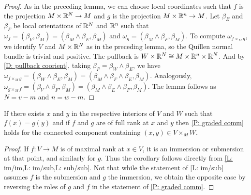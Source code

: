 \begin{proof}
	As in the preceding lemma, we can choose local coordinates such that $f$ is the projection $M\times \mathbb{R}^N\to M$ and $g$ is the projection $M\times \mathbb{R}^n\to M$.
	Let $\beta_E$ and $\beta_F$ be local orientations of $\mathbb{R}^N$ and $\mathbb{R}^n$ such that $\omega_f=(\beta_V,\beta_M)=(\beta_M\wedge \beta_E,\beta_M)$ and $\omega_g=(\beta_M\wedge \beta_F,\beta_M)$.
	To compute $\omega_{f\times_Mg}$, we identify $V$ and $M\times \mathbb{R}^N$ as in the preceding lemma, so the Quillen normal bundle is trivial and positive.
	The pullback is $W\times \mathbb{R}^N\cong M\times \mathbb{R}^n\times \mathbb{R}^N$.
	And by \cref{D: pullback coorient}, taking $\beta_P=\beta_W\wedge \beta_E$, we have $\omega_{f\times_Mg}=(\beta_W\wedge \beta_E,\beta_M)=(\beta_M\wedge \beta_F\wedge \beta_E,\beta_M)$.
	Analogously, $\omega_{g\times_Mf}=(\beta_V\wedge \beta_F,\beta_M)=(\beta_M\wedge \beta_E\wedge \beta_F,\beta_M)$.
	The lemma follows as $N=v-m$ and $n=w-m$.
\end{proof}

\begin{corollary}\label{C: if full}
	If there exists $x$ and $y$ in the respective interiors of $V$ and $W$ such that $f(x)=g(y)$ and if $f$ and $g$ are of full rank at $x$ and $y$ then \cref{P: graded comm} holds for the connected component containing $(x,y)\in V\times_MW$.
\end{corollary}

\begin{proof}
	If $f:V\to M$ is of maximal rank at $x\in V$, it is an immersion or submersion at that point, and similarly for $g$.
	Thus the corollary follows directly from \cref{L: im/im,L: im/sub,L: sub/sub}.
	Not that while the statement of \cref{L: im/sub} assumes $f$ is the submersion and $g$ the immersion, we obtain the opposite case by reversing the roles of $g$ and $f$ in the statement of \cref{P: graded comm}.
\end{proof}

\begin{comment}
	If they are both immersions, apply Lemma \ref{L: im/im}.
	If $f$ is a submersion, it is also a submersion in a neighborhood of $U$ and so it is a submersion on a neighborhood $U$ of $x$.
	Let $A$ be the intersection of $U$ with the interior of $V$.
	By the transversality of $f$ and $g$, if $g(y)=f(x)$, there must be points in a neighborhood of $B$ of $y$ in $W$ that map to $f(A)$, and as a map is a submersion or immersion on an open set, there is a $y'$ in the interior of $B$ that maps to $f(A)$.
	Taking $x'$ in $f^{-1}(y')$, if $g$ is an immersion we apply Lemma \ref{L: im/sub} to $x', y'$, and if $g$ is a submersion we apply Lemma \ref{L: sub/sub}.
	If $f$ is an immersion and $g$ a submersion, we reverse the roles in the argument.
\end{comment}


